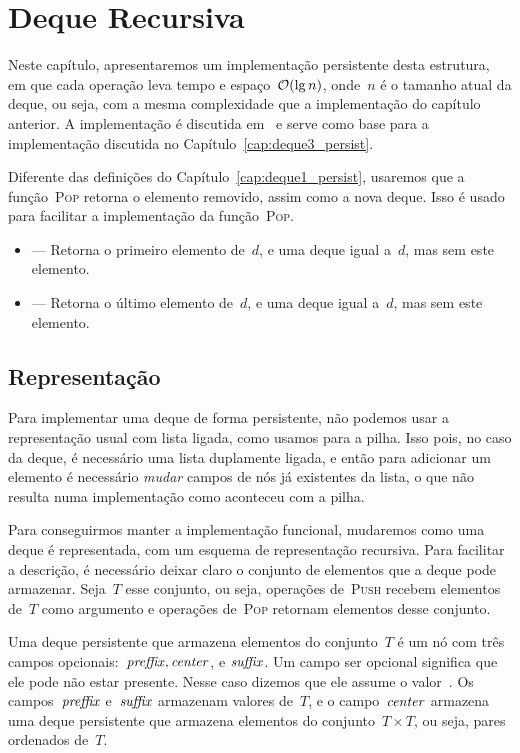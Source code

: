 \documentclass[main.tex]{subfiles}
\begin{document}
\chapter{Deque Recursiva} \label{cap:deque2_persist}

Neste capítulo, apresentaremos um implementação persistente desta estrutura, em que cada operação leva tempo e espaço~$\mathcal{O}(\lg n)$, onde~$n$ é o tamanho atual da deque, ou seja, com a mesma complexidade que a implementação do capítulo anterior. A implementação é discutida em~\cite{Kaplan2001} e serve como base para a implementação discutida no Capítulo~\ref{cap:deque3_persist}.

Diferente das definições do Capítulo~\ref{cap:deque1_persist}, usaremos que a função~\textsc{Pop} retorna o elemento removido, assim como a nova deque. Isso é usado para facilitar a implementação da função~\textsc{Pop}.
\begin{itemize}
	\item {} --- Retorna o primeiro elemento de~$d$, e uma deque igual a~$d$, mas sem este elemento.
	\item {} --- Retorna o último elemento de~$d$, e uma deque igual a~$d$, mas sem este elemento.
\end{itemize}

\section{Representação}

Para implementar uma deque de forma persistente, não podemos usar a representação usual com lista ligada, como usamos para a pilha. Isso pois, no caso da deque, é necessário uma lista duplamente ligada, e então para adicionar um elemento é necessário \emph{mudar} campos de nós já existentes da lista, o que não resulta numa implementação como aconteceu com a pilha.

Para conseguirmos manter a implementação funcional, mudaremos como uma deque é representada, com um esquema de representação recursiva. Para facilitar a descrição, é necessário deixar claro o conjunto de elementos que a deque pode armazenar. Seja~$T$ esse conjunto, ou seja, operações de~\textsc{Push} recebem elementos de~$T$ como argumento e operações de~\textsc{Pop} retornam elementos desse conjunto.

Uma deque persistente que armazena elementos do conjunto~$T$ é um nó com três campos opcionais:~$\mathit{preffix}, \mathit{center}$, e $\mathit{suffix}$. Um campo ser opcional significa que ele pode não estar presente. Nesse caso dizemos que ele assume o valor~. Os campos~$\mathit{preffix}$ e~$\mathit{suffix}$ armazenam valores de~$T$, e o campo~$\mathit{center}$ armazena uma deque persistente que armazena elementos do conjunto~$T \times T$, ou seja, pares ordenados de~$T$.
\end{document}

